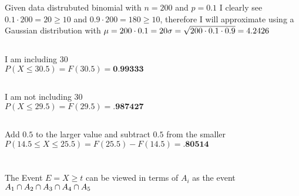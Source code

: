 \documentclass[12pt, letterpaper]{article}
\begin{document}
\newpage
\section{}
Given data distrubuted binomial with $n = 200$ and $p = 0.1$ I clearly see $0.1 \cdot 200 = 20 \ge 10$ and $0.9 \cdot 200 = 180 \ge 10$,
therefore I will approximate using a Gaussian distribution with
\newline
\(
\mu = 200 \cdot 0.1 = 20 \\
\sigma = \sqrt{200\cdot 0.1 \cdot 0.9} = 4.2426 \\
\)
\subsection{}
I am including 30 \\
$P(X \le 30.5) = F(30.5) = \textbf{0.99333}$
\subsection{}
I am not including 30 \\
$P(X \le 29.5) = F(29.5) = \textbf{.987427}$
\subsection{}
Add $0.5$ to the larger value and subtract $0.5$ from the smaller \\
$P(14.5 \le X \le 25.5) = F(25.5) - F(14.5) = \textbf{.80514}$

\newpage
\section{}
\subsection{}
The Event $E = {X \ge t}$ can be viewed in terms of $A_i$ as the event
\newline
\(
A_1 \cap A_2 \cap A_3 \cap A_4 \cap A_5 \\
\)
\subsection{}
\end{document}
